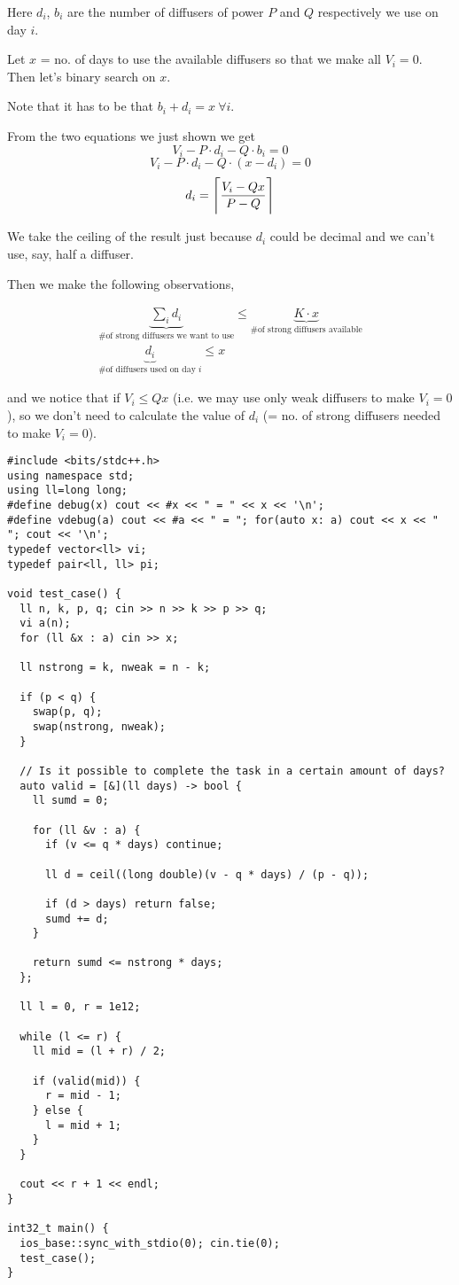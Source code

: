 Here $d_i$, $b_i$ are the number of diffusers of power $P$ and $Q$ respectively we use on day $i$. 

\begin{idea}
    Let $x$ = no. of days to use the available diffusers so that we make all $V_i = 0$. Then let's binary search on $x$.
\end{idea}

Note that it has to be that $b_i + d_i = x\ \forall i$.

From the two equations we just shown we get
$$ V_i - P \cdot d_i - Q \cdot b_i = 0 $$
$$ V_i - P \cdot d_i - Q \cdot (x - d_i) = 0$$
$$ d_i = \ceil[\Bigg]{\frac{V_i - Qx}{P - Q}} $$

We take the ceiling of the result just because $d_i$ could be decimal and we can't use, say, half a diffuser.

Then we make the following observations,

\begin{gather*}
\underbrace{\sum_i d_i}_{\text{\# of strong diffusers we want to use}} 
\leq 
\underbrace{K \cdot x}_{\text{\# of strong diffusers available}}
\\
\underbrace{d_i}_{\text{\# of diffusers used on day } i} \leq x
\end{gather*}

and we notice that if $V_i \leq Qx$ (i.e. we may use only weak diffusers to make $V_i = 0$), so we don't need to calculate the value of $d_i$ (= no. of strong diffusers needed to make $V_i = 0$).

\begin{verbatim}
#include <bits/stdc++.h>
using namespace std;
using ll=long long;
#define debug(x) cout << #x << " = " << x << '\n';
#define vdebug(a) cout << #a << " = "; for(auto x: a) cout << x << " "; cout << '\n';
typedef vector<ll> vi;
typedef pair<ll, ll> pi;

void test_case() {
  ll n, k, p, q; cin >> n >> k >> p >> q;
  vi a(n);
  for (ll &x : a) cin >> x;

  ll nstrong = k, nweak = n - k;
  
  if (p < q) {
    swap(p, q);
    swap(nstrong, nweak);
  }

  // Is it possible to complete the task in a certain amount of days?
  auto valid = [&](ll days) -> bool {
    ll sumd = 0;

    for (ll &v : a) {
      if (v <= q * days) continue;
      
      ll d = ceil((long double)(v - q * days) / (p - q));

      if (d > days) return false;
      sumd += d;
    }

    return sumd <= nstrong * days;
  };

  ll l = 0, r = 1e12; 
  
  while (l <= r) {
    ll mid = (l + r) / 2;

    if (valid(mid)) {
      r = mid - 1; 
    } else {
      l = mid + 1;
    }
  }

  cout << r + 1 << endl;
}

int32_t main() {
  ios_base::sync_with_stdio(0); cin.tie(0);
  test_case();
}
\end{verbatim}